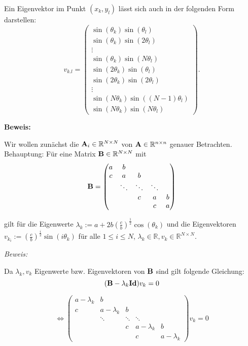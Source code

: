 Ein Eigenvektor im Punkt $(x_{k},y_{l})$ lässt sich auch in der folgenden Form darstellen:
\begin{equation}
v_{k.l} = 
\begin{pmatrix}
\sin(\theta_{k})\sin(\theta_{l})\\
\sin(\theta_{k})\sin(2 \theta_{l})\\
\vdots \\
\sin(\theta_{k})\sin(N \theta_{l})\\
\sin(2 \theta_{k})\sin(\theta_{l})\\
\sin(2 \theta_{k})\sin(2 \theta_{l})\\
\vdots\\
\sin(N \theta_{k})\sin((N-1) \theta_{l})\\
\sin(N \theta_{k})\sin(N \theta_{l})
\end{pmatrix}.
\end{equation}

\textbf{Beweis:}

Wir wollen zunächst die ${\textbf{A}}_{i} \in \mathbb{R}^{N \times N}$ von ${\textbf{A}} \in \mathbb{R}^{n \times n}$ genauer Betrachten.\\
Behauptung: Für eine Matrix ${\textbf{B}} \in \mathbb{R}^{N \times N}$ mit
\begin{equation}
{\textbf{B}} = 
\begin{pmatrix}
a & b\\
c & a & b\\
  & \ddots & \ddots & \ddots\\
  &		   & c & a & b\\
  &		   &  & c & a
\end{pmatrix}
\end{equation}

gilt für die Eigenwerte $\lambda_{k} := a + 2b\left(\frac{c}{b}\right)^{\frac{1}{2}} \cos(\theta_{k})$ und die Eigenvektoren $v_{k_{i}} := \left(\frac{c}{b}\right)^{\frac{i}{2}} \sin(i \theta_{k})$ für alle $1 \le i \le N$, $\lambda_{k} \in \mathbb{R}, v_{k} \in \mathbb{R}^{N \times N}$.

\textit{Beweis:}

Da $\lambda_{k}, v_{k}$ Eigenwerte bzw. Eigenvektoren von ${\textbf{B}}$ sind gilt folgende Gleichung:
\begin{equation}
({\textbf{B}} - \lambda_{k} {\textbf{Id}}) v_{k} = 0
\end{equation}

\begin{equation}
\Longleftrightarrow
\begin{pmatrix}
a - \lambda_{k} & b\\
c & a - \lambda_{k} & b\\
  & \ddots & \ddots & \ddots\\
  &		   & c & a - \lambda_{k} & b\\
  &		   &  & c & a - \lambda_{k}
\end{pmatrix}
v_{k} = 0
\end{equation}

